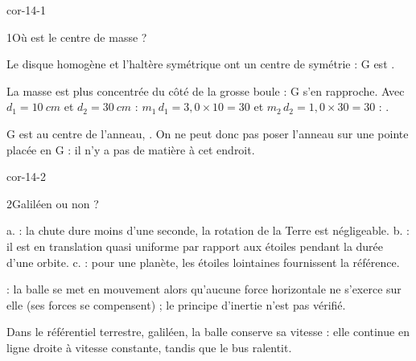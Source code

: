 \corrigesSouples

\begin{blocLivre}{cor-14-1}
\begin{corrige}{1}{Où est le centre de masse ?}
\begin{questions}
\item Le disque homogène et l'haltère symétrique ont un centre de symétrie : G est .
\item La masse est plus concentrée du côté de la grosse boule : G s'en rapproche. Avec $d_1=\qty{10}{cm}$ et
$d_2=\qty{30}{cm}$ : $m_1\,d_1=3{,}0\times10=30$ et $m_2\,d_2=1{,}0\times30=30$ : .
\item G est au centre de l'anneau, . On ne peut donc pas poser l'anneau sur une pointe
placée en G : il n'y a pas de matière à cet endroit.
\end{questions}
\end{corrige}
\end{blocLivre}
\begin{blocLivre}{cor-14-2}
\begin{corrige}{2}{Galiléen ou non ?}
\begin{questions}
\item a.  : la chute dure moins d'une seconde, la rotation de la Terre est négligeable.
b.  : il est en translation quasi uniforme par rapport aux étoiles pendant la durée d'une
orbite. c.  : pour une planète, les étoiles lointaines fournissent la référence.
\item {} : la balle se met en mouvement alors qu'aucune force horizontale ne s'exerce sur elle (ses forces
se compensent) ; le principe d'inertie n'est pas vérifié.
\item Dans le référentiel terrestre, galiléen, la balle conserve sa vitesse : elle continue en ligne droite à vitesse
constante, tandis que le bus ralentit.
\end{questions}
\end{corrige}
\end{blocLivre}
